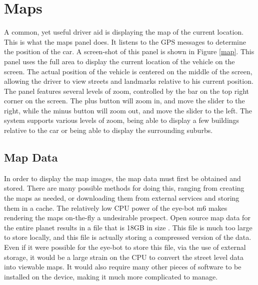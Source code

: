 

\section{Maps}

A common, yet useful driver aid is displaying the map of the current location. This is what the maps panel does. It listens to the GPS messages to determine the position of the car. A screen-shot of this panel is shown in Figure \ref{map}. This panel uses the full area to display the current location of the vehicle on the screen. The actual position of the vehicle is centered on the middle of the screen, allowing the driver to view streets and landmarks relative to his current position. The panel features several levels of zoom, controlled by the bar on the top right corner on the screen. The plus button will zoom in, and move the slider to the right, while the minus button will zoom out, and move the slider to the left. The system supports various levels of zoom, being able to display a few buildings relative to the car or being able to display the surrounding suburbs.


\subsection{Map Data}

In order to display the map images, the map data must first be obtained and stored. There are many possible methods for doing this, ranging from creating the maps as needed, or downloading them from external services and storing them in a cache. The relatively low CPU power of the eye-bot m6 makes rendering the maps on-the-fly a undesirable prospect. Open source map data for the entire planet results in a file that is 18GB in size \cite{planet_osm}. This file is much too large to store locally, and this file is actually storing a compressed version of the data. Even if it were possible for the eye-bot to store this file, via the use of external storage, it would be a large strain on the CPU to convert the street level data into viewable maps. It would also require many other pieces of software to be installed on the device, making it much more complicated to manage.

